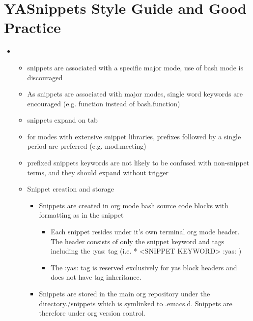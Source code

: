 \documentclass{article}
\begin{document}
\section*{YASnippets Style Guide and Good Practice}
\label{sec:orgdaeae66}
\begin{itemize}
\item \begin{itemize}
\item snippets are associated with a specific major mode, use of bash mode is discouraged
\item As snippets are associated with major modes, single word keywords are encouraged (e.g. function instead of bash.function)
\item snippets expand on tab
\item for modes with extensive snippet libraries, prefixes followed by a single period are preferred (e.g. mod.meeting)
\item prefixed snippets keywords are not likely to be confused with non-snippet terms, and they should expand without trigger
\item Snippet creation and storage
\begin{itemize}
\item Snippets are created in org mode bash source code blocks with formatting as in the snippet
\begin{itemize}
\item Each snippet resides under it's own terminal org mode header. The header consists of only the snippet keyword and tags including the :yas: tag (i.e. * <SNIPPET KEYWORD> :yas: )
\item The :yas: tag is reserved exclusively for yas block headers and does not have tag inheritance.
\end{itemize}
\item Snippets are stored in the main org repository under the directory./snippets which is symlinked to .emacs.d. Snippets are therefore under org version control.
\end{itemize}
\end{itemize}
\end{itemize}
\end{document}
